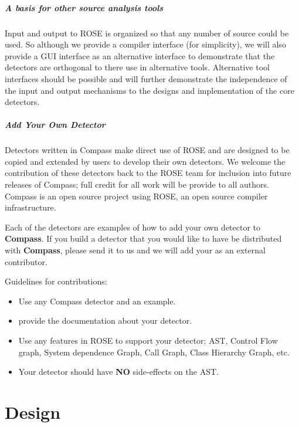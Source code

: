 \paragraph{A basis for other source analysis tools}
   Input and output to ROSE is organized so that any number of source could be used.
So although we provide a compiler interface (for simplicity), we will also provide a 
GUI interface as an alternative interface to demonstrate that the detectors are orthogonal
to there use in alternative tools.  Alternative tool interfaces should be possible 
and will further demonstrate the independence of the input and output mechanisms to
the designs and implementation of the core detectors.

\paragraph{Add Your Own Detector}

    Detectors written in Compass make direct use of ROSE and are 
designed to be copied and extended by users to develop their own 
detectors. We welcome the contribution of these detectors back to 
the ROSE team for inclusion into future releases of Compass;
full credit for all work will be provide to all authors.
Compass is an open source project using ROSE, an open source
compiler infrastructure.

    Each of the detectors are examples of how to
add your own detector to {\bf Compass}.  If you
build a detector that you would like to have be 
distributed with {\bf Compass}, please send it to
us and we will add your as an external contributor.

  Guidelines for contributions:
\begin{itemize}
   \item Use any Compass detector and an example.
   \item provide the documentation about your detector.
   \item Use any features in ROSE to support your detector; AST, Control Flow graph,
    System dependence Graph, Call Graph, Class Hierarchy Graph, etc.
   \item Your detector should have {\bf NO} side-effects on the AST.
\end{itemize}






\chapter{Design}


